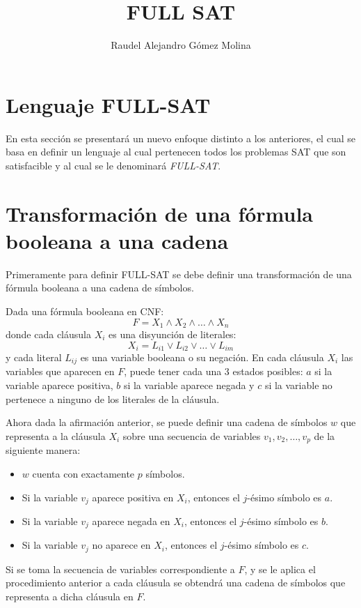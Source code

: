 \documentclass{article}
\title{FULL SAT}
\author{Raudel Alejandro Gómez Molina}
\begin{document}
\maketitle

\section{Lenguaje FULL-SAT}

En esta sección se presentará un nuevo enfoque distinto a los anteriores, el cual se basa en definir un lenguaje al cual
pertenecen todos los problemas SAT que son satisfacible y al cual se le denominará \textit{FULL-SAT}.

\section{Transformación de una fórmula booleana a una cadena}

Primeramente para definir FULL-SAT se debe definir una transformación de una fórmula booleana a una cadena de símbolos.

Dada una fórmula booleana en CNF:
$$F=X_1 \wedge X_2 \wedge \ldots \wedge X_n$$
donde cada cláusula $X_i$ es una disyunción de literales:
$$X_i=L_{i1} \vee L_{i2} \vee \ldots \vee L_{im}$$
y cada literal $L_{ij}$ es una variable booleana o su negación. En cada cláusula $X_i$ las variables que aparecen en $F$,
puede tener cada una 3 estados posibles: $a$ si la variable aparece positiva, $b$ si la variable aparece negada y $c$ si la variable
no pertenece a ninguno de los literales de la cláusula.

Ahora dada la afirmación anterior, se puede definir una cadena de símbolos $w$
que representa a la cláusula $X_i$ sobre una secuencia de variables $v_1,v_2,\ldots,v_p$ de la siguiente manera:

\begin{itemize}
    \item $w$ cuenta con exactamente $p$ símbolos.
    \item Si la variable $v_j$ aparece positiva en $X_i$, entonces el $j$-ésimo símbolo es $a$.
    \item Si la variable $v_j$ aparece negada en $X_i$, entonces el $j$-ésimo símbolo es $b$.
    \item Si la variable $v_j$ no aparece en $X_i$, entonces el $j$-ésimo símbolo es $c$.
\end{itemize}
Si se toma la secuencia de variables correspondiente a $F$, y se le aplica el procedimiento anterior a cada cláusula
se obtendrá una cadena de símbolos que representa a dicha cláusula en $F$.
\end{document}
